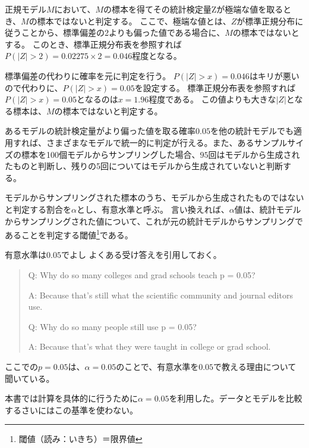 正規モデル$M$において、$M$の標本を得てその統計検定量Zが極端な値を取るとき、$M$の標本ではないと判定する。
ここで、極端な値とは、$Z$が標準正規分布に従うことから、標準偏差の2よりも偏った値である場合に、$M$の標本ではないとする。
このとき、標準正規分布表を参照すれば$P(|Z|>2)=0.02275\times 2=0.046$程度となる。

標準偏差の代わりに確率を元に判定を行う。
$P(|Z|>x)=0.046$はキリが悪いので代わりに、$P(|Z|>x)=0.05$を設定する。
標準正規分布表を参照すれば$P(|Z|>x)=0.05$となるのは$x=1.96$程度である。
この値よりも大きな$|Z|$となる標本は、$M$の標本ではないと判定する。

あるモデルの統計検定量がより偏った値を取る確率$0.05$を他の統計モデルでも適用すれば、さまざまなモデルで統一的に判定が行える。また、あるサンプルサイズの標本を100個モデルからサンプリングした場合、$95$回はモデルから生成されたものと判断し、残りの5回についてはモデルから生成されていないと判断する。


\begin{defi}
 モデルからサンプリングされた標本のうち、モデルから生成されたものではないと判定する割合を$\alpha$とし、有意水準と呼ぶ。
 言い換えれば、$\alpha$値は、統計モデルからサンプリングされた値について、これが元の統計モデルからサンプリングであることを判定する閾値\footnote{閾値（読み：いきち）＝限界値}である。
\end{defi}



\begin{SMbox}{有意水準は$0.05$でよし}
    よくある受け答えを引用しておく\cite{greenland2016statistical}。
    \begin{quote}
        Q: Why do so many colleges and grad schools teach p = 0.05?

        A: Because that's still what the scientific community and journal editors use.

        Q: Why do so many people still use p = 0.05?

        A: Because that's what they were taught in college or grad school.
    \end{quote}
 ここでの$p=0.05$は、$\alpha=0.05$のことで、有意水準を$0.05$で教える理由について聞いている。

本書では計算を具体的に行うために$\alpha=0.05$を利用した。データとモデルを比較するさいにはこの基準を使わない。
\end{SMbox}


